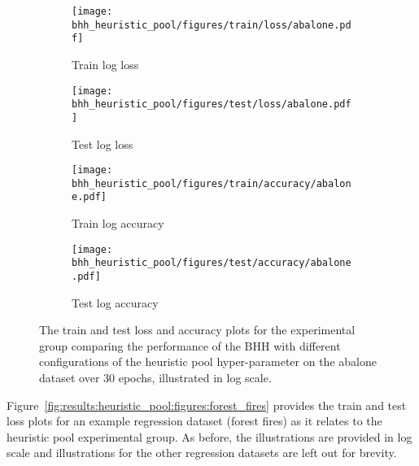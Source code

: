 \begin{figure}[htb]
      \begin{subfigure}{0.5\textwidth}
            \centering
            \texttt{[image: bhh\_heuristic\_pool/figures/train/loss/abalone.pdf]}
            \caption{Train log loss}
            \label{fig:results:heuristic_pool:figures:loss:train:abalone}
      \end{subfigure}
      \begin{subfigure}{0.5\textwidth}
            \centering
            \texttt{[image: bhh\_heuristic\_pool/figures/test/loss/abalone.pdf]}
            \caption{Test log loss}
            \label{fig:results:heuristic_pool:figures:loss:test:abalone}
      \end{subfigure}
      \par\bigskip
      \begin{subfigure}{0.5\textwidth}
            \centering
            \texttt{[image: bhh\_heuristic\_pool/figures/train/accuracy/abalone.pdf]}
            \caption{Train log accuracy}
            \label{fig:results:heuristic_pool:figures:accuracy:train:abalone}
      \end{subfigure}
      \begin{subfigure}{0.5\textwidth}
            \centering
            \texttt{[image: bhh\_heuristic\_pool/figures/test/accuracy/abalone.pdf]}
            \caption{Test log accuracy}
            \label{fig:results:heuristic_pool:figures:accuracy:test:abalone}
      \end{subfigure}
      \par\bigskip
      \caption{The train and test loss and accuracy plots for the experimental group comparing the performance of the \acs{BHH} with different configurations of the heuristic pool hyper-parameter on the abalone dataset over 30 epochs, illustrated in log scale.}
      \label{fig:results:heuristic_pool:figures:abalone}
\end{figure}

Figure~\ref{fig:results:heuristic_pool:figures:forest_fires} provides the train and test loss plots for an example regression dataset (forest fires) as it relates to the heuristic pool experimental group. As before, the illustrations are provided in log scale and illustrations for the other regression datasets are left out for brevity.

